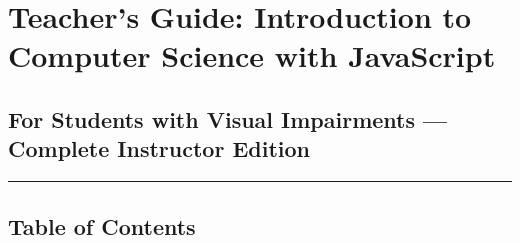 \documentclass[
  justified,
  openright,
]{tufte-book}
\begin{document}
\newpage

\section{Teacher's Guide: Introduction to Computer Science with
JavaScript}\label{teachers-guide-introduction-to-computer-science-with-javascript}

\subsection{For Students with Visual Impairments --- Complete Instructor
Edition}\label{for-students-with-visual-impairments-complete-instructor-edition}

\begin{center}\rule{0.5\linewidth}{0.5pt}\end{center}

\subsection{Table of Contents}\label{table-of-contents}
\end{document}
